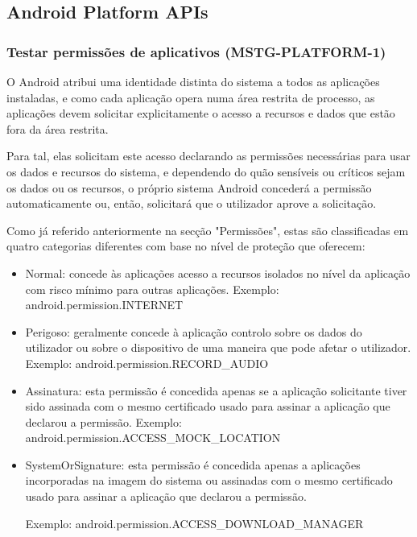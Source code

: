\subsection{Android Platform APIs}
\subsubsection{Testar permissões de aplicativos (MSTG-PLATFORM-1)}\par
\hfill\par
\hfill\par
\par O Android atribui uma identidade distinta do sistema a todos as aplicações instaladas, e como cada aplicação opera numa área restrita de processo, as aplicações devem solicitar explicitamente o acesso a recursos e dados que estão fora da área restrita. 

\par Para tal, elas solicitam este acesso declarando as permissões necessárias para usar os dados e recursos do sistema, e dependendo do quão sensíveis ou críticos sejam os dados ou os recursos, o próprio sistema Android concederá a permissão automaticamente ou, então, solicitará que o utilizador aprove a solicitação.

Como já referido anteriormente na secção "Permissões", estas são classificadas em quatro categorias diferentes com base no nível de proteção que oferecem:

\begin{itemize}
    \item Normal: concede às aplicações acesso a recursos isolados no nível da aplicação com risco mínimo para outras aplicações. Exemplo: android.permission.INTERNET

    \item Perigoso: geralmente concede à aplicação controlo sobre os dados do utilizador ou sobre o dispositivo de uma maneira que pode afetar o utilizador. 
    Exemplo: android.permission.RECORD\_AUDIO

    \item Assinatura: esta permissão é concedida apenas se a aplicação solicitante tiver sido assinada com o mesmo certificado usado para assinar a aplicação que declarou a permissão. 
    Exemplo: android.permission.ACCESS\_MOCK\_LOCATION

    \item SystemOrSignature: esta permissão é concedida apenas a aplicações incorporadas na imagem do sistema ou assinadas com o mesmo certificado usado para assinar a aplicação que declarou a permissão. 
    \par Exemplo: android.permission.ACCESS\_DOWNLOAD\_MANAGER
\end{itemize}




